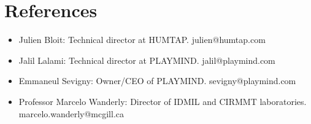\documentclass[10pt,a4paper,sans]{moderncv}        %
\begin{document}

\section{References}
\begin{cvcolumns}
  \cvcolumn{}
  {\begin{itemize}
  \item Julien Bloit: Technical director at HUMTAP. julien@humtap.com
  \item Jalil Lalami: Technical director at PLAYMIND. jalil@playmind.com
  \item Emmaneul Sevigny: Owner/CEO of PLAYMIND. sevigny@playmind.com
  \item Professor Marcelo Wanderly: Director of IDMIL and CIRMMT laboratories. marcelo.wanderly@mcgill.ca
  \end{itemize}}
\end{cvcolumns}

% 

\end{document}
